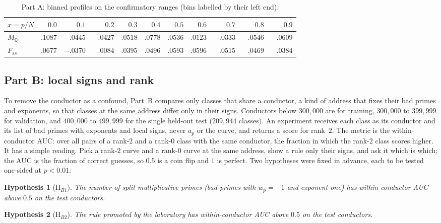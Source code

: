 \documentclass[11pt]{amsart}
\numberwithin{equation}{section}
\newtheorem{hypothesis}{Hypothesis}
\newcommand{\Q}{\mathbb{Q}}
\begin{document}
\begin{table}[ht]
\centering\small
\caption{Part A: binned profiles on the confirmatory ranges (bins labelled by their left end).}\label{tab:partA}
\setlength{\tabcolsep}{3.5pt}
\begin{tabular}{@{}lrrrrrrrrrr@{}}
\toprule
$x=p/N$ & $0.0$ & $0.1$ & $0.2$ & $0.3$ & $0.4$ & $0.5$ & $0.6$ & $0.7$ & $0.8$ & $0.9$\\
\midrule
$M_\Q$ & $.1087$ & $-.0445$ & $-.0427$ & $.0518$ & $.0778$ & $.0536$ & $.0123$ & $-.0333$ & $-.0546$ & $-.0609$\\
$F_{ss}$ & $.0677$ & $-.0370$ & $.0084$ & $.0395$ & $.0496$ & $.0593$ & $.0596$ & $.0515$ & $.0469$ & $.0384$\\
\bottomrule
\end{tabular}
\end{table}

\subsection{Part B: local signs and rank}
To remove the conductor as a confound, Part~B compares only classes that share a conductor, a kind of address that fixes their bad primes and exponents, so that classes at the same address differ only in their signs. Conductors below $300{,}000$ are for training, $300{,}000$ to $399{,}999$ for validation, and $400{,}000$ to $499{,}999$ for the single held-out test ($209{,}944$ classes). An experiment receives each class as its conductor and its list of bad primes with exponents and local signs, never $a_p$ or the curve, and returns a score for rank~$2$. The metric is the within-conductor AUC: over all pairs of a rank-$2$ and a rank-$0$ class with the same conductor, the fraction in which the rank-$2$ class scores higher. It has a simple reading. Pick a rank-$2$ curve and a rank-$0$ curve at the same address, show a rule only their signs, and ask it which is which; the AUC is the fraction of correct guesses, so $0.5$ is a coin flip and $1$ is perfect. Two hypotheses were fixed in advance, each to be tested one-sided at $p<0.01$:

\begin{hypothesis}[H$_{B1}$]
The number of split multiplicative primes (bad primes with $w_p=-1$ and exponent one) has within-conductor AUC above $0.5$ on the test conductors.
\end{hypothesis}

\begin{hypothesis}[H$_{B2}$]
The rule promoted by the laboratory has within-conductor AUC above $0.5$ on the test conductors.
\end{hypothesis}
\end{document}
